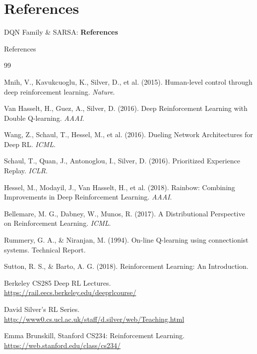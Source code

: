 \section{References}
\begin{frame}{}
    \LARGE DQN Family \& SARSA: \textbf{References}
\end{frame}

\begin{frame}[allowframebreaks]{References}
\begin{thebibliography}{99}

Mnih, V., Kavukcuoglu, K., Silver, D., et al. (2015).
\newblock Human-level control through deep reinforcement learning.
\newblock \emph{Nature}.

Van Hasselt, H., Guez, A., Silver, D. (2016).
\newblock Deep Reinforcement Learning with Double Q-learning.
\newblock \emph{AAAI}.

Wang, Z., Schaul, T., Hessel, M., et al. (2016).
\newblock Dueling Network Architectures for Deep RL.
\newblock \emph{ICML}.

Schaul, T., Quan, J., Antonoglou, I., Silver, D. (2016).
\newblock Prioritized Experience Replay.
\newblock \emph{ICLR}.

Hessel, M., Modayil, J., Van Hasselt, H., et al. (2018).
\newblock Rainbow: Combining Improvements in Deep Reinforcement Learning.
\newblock \emph{AAAI}.

Bellemare, M. G., Dabney, W., Munos, R. (2017).
\newblock A Distributional Perspective on Reinforcement Learning.
\newblock \emph{ICML}.

Rummery, G. A., \& Niranjan, M. (1994).
\newblock On-line Q-learning using connectionist systems.
\newblock Technical Report.

Sutton, R. S., \& Barto, A. G. (2018).
\newblock Reinforcement Learning: An Introduction.

Berkeley CS285 Deep RL Lectures.\\
\url{https://rail.eecs.berkeley.edu/deeprlcourse/}

David Silver’s RL Series.\\
\url{http://www0.cs.ucl.ac.uk/staff/d.silver/web/Teaching.html}

Emma Brunskill, Stanford CS234: Reinforcement Learning.\\
\url{https://web.stanford.edu/class/cs234/}


\end{thebibliography}
\end{frame}
